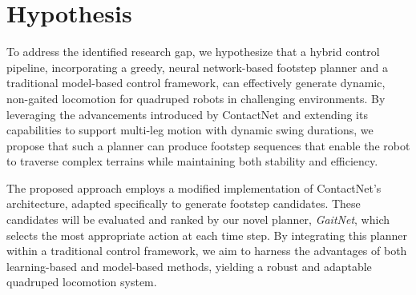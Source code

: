\section{Hypothesis}
\label{sec:introduction-hypothesis}

To address the identified research gap, we hypothesize that a hybrid
control pipeline, incorporating a greedy, neural network-based
footstep planner and a traditional model-based control framework, can
effectively generate dynamic, non-gaited locomotion for quadruped
robots in challenging environments. By leveraging the advancements
introduced by ContactNet and extending its capabilities to support
multi-leg motion with dynamic swing durations, we propose that such a
planner can produce footstep sequences that enable the robot to
traverse complex terrains while maintaining both stability and efficiency.

The proposed approach employs a modified implementation of
ContactNet's architecture, adapted specifically to generate footstep
candidates. These candidates will be evaluated and ranked by our
novel planner, \textit{GaitNet}, which selects the most appropriate
action at each time step. By integrating this planner within a
traditional control framework, we aim to harness the advantages of
both learning-based and model-based methods, yielding a robust and
adaptable quadruped locomotion system.
